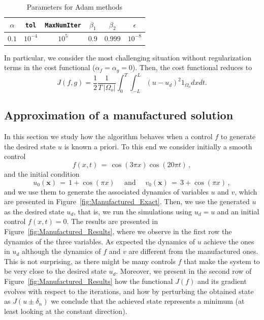 \documentclass[11pt]{article}
\def \x{\boldsymbol{x}}
\numberwithin{theorem}{section}
\begin{document}
\begin{table}[H]
\begin{center}
\begin{tabular}{|c|c|c|c|c|c|}
\hline
$\alpha$ & \texttt{tol} & \texttt{MaxNumIter}& $\beta_1$ & $\beta_2$ & $\epsilon$	
 \\
\hline
$0.1$ & $10^{-4}$ & $10^5$ & 0.9 & 0.999 & $10^{-8}$
\\
\hline
\end{tabular}
\caption{Parameters for Adam methods}
\label{tab:ADAMSparameters}
\end{center}
\end{table}

In particular, we consider the most challenging situation without regularization terms in the cost functional ($\alpha_f=\alpha_g=0$). Then, the cost functional reduces to
$$
J(f,g)=\frac{1}{2} \frac{1}{T\, |\Omega_o|}\int_0^T\!\!\int_{-L}^L (u-u_d)^2 1_{\Omega_o} dx dt.
$$

\subsection{Approximation of a manufactured solution}\label{subsec:manufacsol}

In this section we study how the algorithm behaves when a control $f$ to generate the desired state $u$ is known a priori. To this end we consider initially a smooth control
$$
f(x,t)
\,=\,
\cos(3\pi x)\cos(20\pi t)\,,
$$
and the initial condition
$$
u_0(\x)
\,=\,
1+\cos(\pi x)
\quad\mbox{ and }\quad
v_0(\x)
\,=\,
3+\cos(\pi x)\,,
$$
and we use them to generate the associated dynamics of variables $u$ and $v$, which are presented in Figure~\ref{fig:Manufactured_Exact}. Then, we use the generated $u$ as the desired state $u_d$, that is, we run the simulations using $u_d=u$ and an initial control $f(x,t)=0$. The results are presented in Figure~\ref{fig:Manufactured_Results}, where we observe in the first row the dynamics of the three variables. As expected the dynamics of $u$ achieve the ones in $u_d$ although the dynamics of $f$ and $v$ are different from the manufactured ones. This is not surprising, as there might be many controls $f$ that make the system to be very close to the desired state $u_d$. Moreover, we present in the second row of Figure~\ref{fig:Manufactured_Results} how the functional $J(f)$ and its gradient evolves with respect to the iterations, and how by perturbing the obtained state as $J(u\pm \delta_n)$ we conclude that the achieved state represents a minimum (at least looking at the constant direction).
\end{document}
